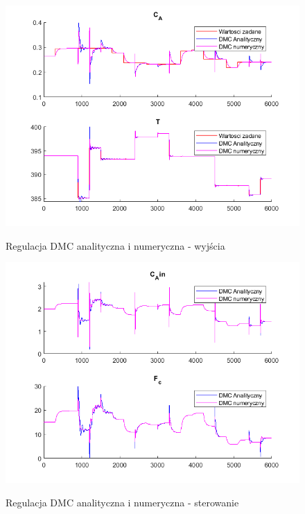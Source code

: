 \begin{figure}[h!]
	\centering
	\includegraphics[width=.7\linewidth]{img/yComparedDMC.png}
	\label{ch2:dmcster}
	\caption{Regulacja DMC analityczna i numeryczna - wyjścia}
\end{figure}
\begin{figure}[h!]
	\centering
	\includegraphics[width=.7\linewidth]{img/uComparedDMC.png}
	\label{ch2:dmc}
	\caption{Regulacja DMC analityczna i numeryczna - sterowanie}
\end{figure}